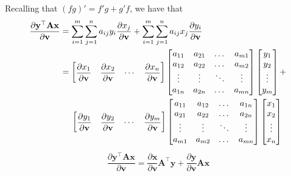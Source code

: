 \documentclass{article}
\newcommand{\trans}{\top}
\begin{document}
Recalling that \((fg)' = f'g + g'f\), we have that
\begin{align}
    \dfrac{\partial \mathbf{y}^\trans \mathbf{A} \mathbf{x}}{\partial \mathbf{v}} & = \sum_{i = 1}^{m}\sum_{j = 1}^{n} a_{ij} y_{i} \dfrac{\partial x_{j}}{\partial \mathbf{v}} + \sum_{i = 1}^{m}\sum_{j = 1}^{n} a_{ij} x_{j} \dfrac{\partial y_{i}}{\partial \mathbf{v}} \\
    & = \begin{bmatrix}
        \dfrac{\partial x_1}{\partial \mathbf{v}} & \dfrac{\partial x_2}{\partial \mathbf{v}} & \cdots & \dfrac{\partial x_n}{\partial \mathbf{v}}
    \end{bmatrix}
    \begin{bmatrix}
        a_{11} & a_{21} & \dots & a_{m1} \\
        a_{12} & a_{22} & \dots & a_{m2} \\
        \vdots & \vdots & \ddots & \vdots \\
        a_{1n} & a_{2n} & \dots & a_{mn} \\
    \end{bmatrix}
    \begin{bmatrix}
        y_1 \\
        y_2 \\
        \vdots \\
        y_m
    \end{bmatrix} + \\
    & \hspace{3ex} \begin{bmatrix}
        \dfrac{\partial y_1}{\partial \mathbf{v}} & \dfrac{\partial y_2}{\partial \mathbf{v}} & \cdots & \dfrac{\partial y_m}{\partial \mathbf{v}}
    \end{bmatrix}
    \begin{bmatrix}
        a_{11} & a_{12} & \dots & a_{1n} \\
        a_{21} & a_{22} & \dots & a_{2n} \\
        \vdots & \vdots & \ddots & \vdots \\
        a_{m1} & a_{m2} & \dots & a_{mn} \\
    \end{bmatrix}
    \begin{bmatrix}
        x_1 \\
        x_2 \\
        \vdots \\
        x_n
    \end{bmatrix}
\end{align}
\begin{align}
    \boxed{\dfrac{\partial \mathbf{y}^\trans \mathbf{A} \mathbf{x}}{\partial \mathbf{v}} = \dfrac{\partial \mathbf{x}}{\partial \mathbf{v}} \mathbf{A}^{\trans} \mathbf{y} + \dfrac{\partial \mathbf{y}}{\partial \mathbf{v}} \mathbf{A} \mathbf{x}}
\end{align}
\end{document}
